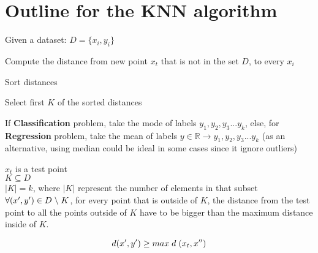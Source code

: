 \section{Outline for the KNN algorithm}
\begin{outline}

    \1  Given a dataset: $D=\{x_i,y_i\}$

    \1  Compute the distance from new point $x_t$ that is not in the set $D$, to every  $x_i$

    \1  Sort distances

    \1  Select first $K$ of the sorted distances

    \1  If \textbf{Classification} problem, take the mode of labels $y_1, y_2, y_3 ... y_k$, else, for \textbf{Regression}
        problem, take the mean of labels $y \in \mathbb{R} \rightarrow y_1, y_2, y_3 ... y_k$ (as an alternative, using median could be
        ideal in some cases since it ignore outliers)

\end{outline}

$x_t$ is a test point\\

$K \subseteq D$ \\

$|K| = k$, where $|K|$ represent the number of elements in that subset\\

$\forall(x^{\prime},y^{\prime}) \in D \hspace{1 mm} \backslash \hspace{1 mm} K$, for every point that is outside of $K$,
the distance from the test point to all the points outside of $K$ have to be bigger than the maximum distance inside of $K$.

\[
    d(x^{\prime},y^{\prime}) \geq max \hspace{1 mm} d \hspace{1 mm} (x_t, x^{\prime\prime})
\]


